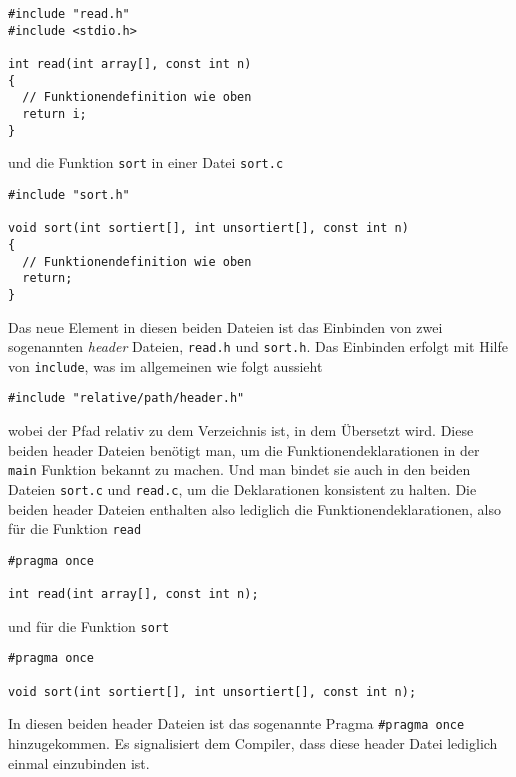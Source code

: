 \begin{minipage}{\linewidth}
\begin{lstlisting}[caption={Datei \texttt{read.c}}, belowcaptionskip=0.3em]
#include "read.h"
#include <stdio.h>
  
int read(int array[], const int n)
{
  // Funktionendefinition wie oben
  return i;
}
\end{lstlisting}
\end{minipage}
und die Funktion \texttt{sort} in einer Datei \texttt{sort.c}

\begin{minipage}{\linewidth}
\begin{lstlisting}[caption={Datei \texttt{sort.c}}, belowcaptionskip=0.3em]
#include "sort.h"
  
void sort(int sortiert[], int unsortiert[], const int n)
{
  // Funktionendefinition wie oben
  return;
}
\end{lstlisting}
\end{minipage}
Das neue Element in diesen beiden Dateien ist das Einbinden von zwei sogenannten \emph{header} Dateien, \texttt{read.h} und \texttt{sort.h}.
Das Einbinden erfolgt mit Hilfe von \texttt{include}, was im allgemeinen wie folgt aussieht
\begin{lstlisting}
#include "relative/path/header.h"
\end{lstlisting}
wobei der Pfad relativ zu dem Verzeichnis ist, in dem Übersetzt wird.
Diese beiden header Dateien benötigt man, um die Funktionendeklarationen in der \texttt{main} Funktion bekannt zu machen.
Und man bindet sie auch in den beiden Dateien \texttt{sort.c} und \texttt{read.c}, um die Deklarationen konsistent zu halten.
Die beiden header Dateien enthalten also lediglich die Funktionendeklarationen, also für die Funktion \texttt{read}
\begin{lstlisting}[caption={Datei \texttt{read.h}}, belowcaptionskip=0.3em]
#pragma once
  
int read(int array[], const int n);
\end{lstlisting}
und für die Funktion \texttt{sort}
\begin{lstlisting}[caption={Datei \texttt{sort.h}}, belowcaptionskip=0.3em]
#pragma once
  
void sort(int sortiert[], int unsortiert[], const int n);
\end{lstlisting}
In diesen beiden header Dateien ist das sogenannte Pragma \verb|#pragma once| hinzugekommen.
Es signalisiert dem Compiler, dass diese header Datei lediglich einmal einzubinden ist.
